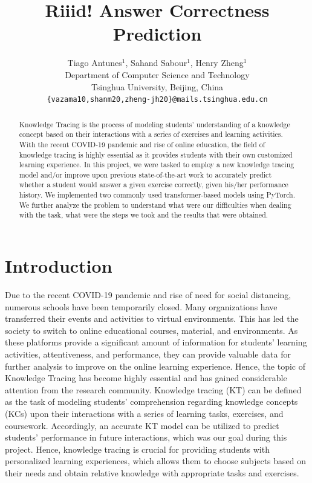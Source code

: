 \documentclass{article}
\title{Riiid! Answer Correctness Prediction}
\author{%
  Tiago Antunes$^1$, Sahand Sabour$^1$, Henry Zheng$^1$  \\
  Department of Computer Science and Technology\\
  Tsinghua University, Beijing, China\\
  \texttt{\{vazama10,shanm20,zheng-jh20\}@mails.tsinghua.edu.cn}
}
\begin{document}
\maketitle

\begin{abstract}
    Knowledge Tracing is the process of modeling students' understanding of a knowledge concept based on their interactions with a series of exercises and learning activities. With the recent COVID-19 pandemic and rise of online education, the field of knowledge tracing is highly essential as it provides students with their own customized learning experience. In this project, we were tasked to employ a new knowledge tracing model and/or improve upon previous state-of-the-art work to accurately predict whether a student would answer a given exercise correctly, given his/her performance history. We implemented two commonly used transformer-based models using PyTorch. We further analyze the problem to understand what were our difficulties when dealing with the task, what were the steps we took and the results that were obtained.
\end{abstract}

\section{Introduction}

Due to the recent COVID-19 pandemic and rise of need for social distancing, numerous schools have been temporarily closed. Many organizations have transferred their events and activities to virtual environments. This has led the society to switch to online educational courses, material, and environments. As these platforms provide a significant amount of information for students' learning activities, attentiveness, and performance, they can provide valuable data for further analysis to improve on the online learning experience. Hence, the topic of Knowledge Tracing has become highly essential and has gained considerable attention from the research community. Knowledge tracing (KT) can be defined as the task of modeling students' comprehension regarding knowledge concepts (KCs) upon their interactions with a series of learning tasks, exercises, and coursework. Accordingly, an accurate KT model can be utilized to predict students' performance in future interactions, which was our goal during this project. Hence, knowledge tracing is crucial for providing students with personalized learning experiences, which allows them to choose subjects based on their needs and obtain relative knowledge with appropriate tasks and exercises.
\end{document}
